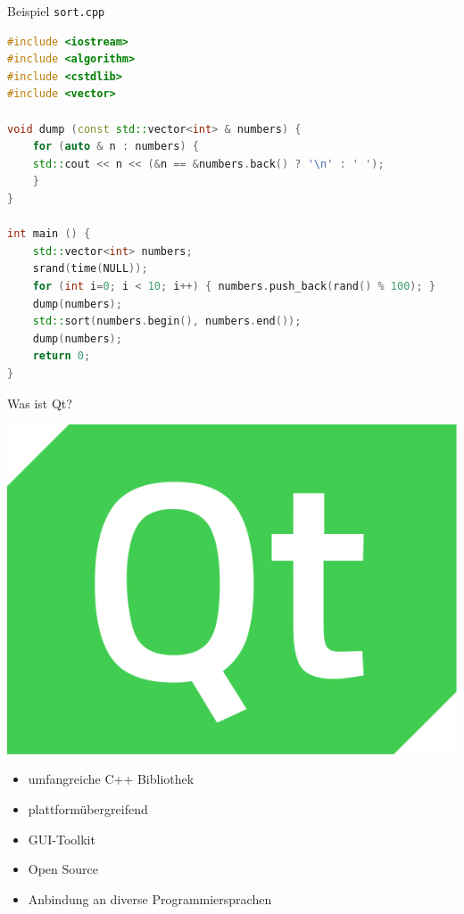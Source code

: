 \documentclass[aspectratio=169]{beamer}
\begin{document}

\begin{frame}[fragile]{Beispiel \texttt{sort.cpp}}
\scriptsize
\vspace*{-5pt}
\begin{lstlisting}[language=C++]
#include <iostream>
#include <algorithm>
#include <cstdlib>
#include <vector>

void dump (const std::vector<int> & numbers) {
    for (auto & n : numbers) {
	std::cout << n << (&n == &numbers.back() ? '\n' : ' ');
    }
}

int main () {
    std::vector<int> numbers;
    srand(time(NULL));
    for (int i=0; i < 10; i++) { numbers.push_back(rand() % 100); }
    dump(numbers);
    std::sort(numbers.begin(), numbers.end());
    dump(numbers);
    return 0;
}
\end{lstlisting}
\end{frame}


\begin{frame}[fragile]{Was ist Qt?}
\begin{flushright}
\includegraphics[scale=0.1]{logo}
\end{flushright}
\begin{itemize}
\item umfangreiche C++ Bibliothek
\item plattformübergreifend
\item GUI-Toolkit
\item Open Source
\item Anbindung an diverse Programmiersprachen
\end{itemize}
\end{frame}
\end{document}
